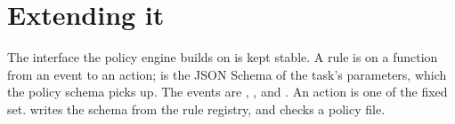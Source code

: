 \section{Extending it}

The interface the policy engine builds on is kept stable. A rule is  on a function from an event to an action;  is the JSON Schema of the task's parameters, which the policy schema picks up. The events are , ,  and . An action is one of the fixed set.  writes the schema from the rule registry, and  checks a policy file.
